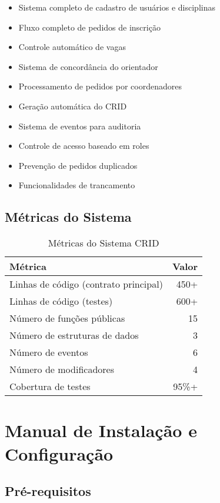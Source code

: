 \documentclass[12pt,a4paper]{article}
\begin{document}
\begin{itemize}
    \item Sistema completo de cadastro de usuários e disciplinas
    \item Fluxo completo de pedidos de inscrição
    \item Controle automático de vagas
    \item Sistema de concordância do orientador
    \item Processamento de pedidos por coordenadores
    \item Geração automática do CRID
    \item Sistema de eventos para auditoria
    \item Controle de acesso baseado em roles
    \item Prevenção de pedidos duplicados
    \item Funcionalidades de trancamento
\end{itemize}

\subsection{Métricas do Sistema}

\begin{table}[H]
\centering
\begin{tabular}{|l|r|}
\hline
\textbf{Métrica} & \textbf{Valor} \\
\hline
Linhas de código (contrato principal) & 450+ \\
Linhas de código (testes) & 600+ \\
Número de funções públicas & 15 \\
Número de estruturas de dados & 3 \\
Número de eventos & 6 \\
Número de modificadores & 4 \\
Cobertura de testes & 95\%+ \\
\hline
\end{tabular}
\caption{Métricas do Sistema CRID}
\end{table}

\section{Manual de Instalação e Configuração}

\subsection{Pré-requisitos}
\end{document}
